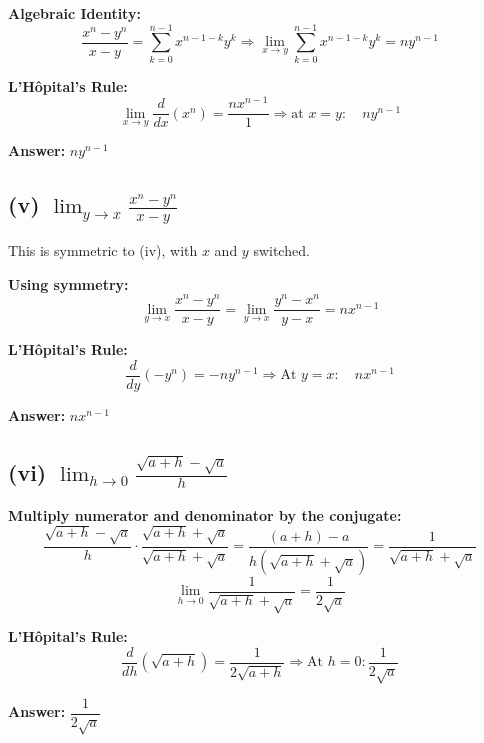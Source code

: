 \documentclass[12pt]{article}
\begin{document}
\textbf{Algebraic Identity:}
\[
\frac{x^n - y^n}{x - y} = \sum_{k=0}^{n-1} x^{n-1-k} y^k
\Rightarrow \lim_{x \to y} \sum_{k=0}^{n-1} x^{n-1-k} y^k = n y^{n-1}
\]

\textbf{L’Hôpital’s Rule:}
\[
\lim_{x \to y} \frac{d}{dx} \left( x^n \right) = \frac{n x^{n-1}}{1} \Rightarrow \text{at } x = y: \quad n y^{n-1}
\]

\textbf{Answer:} \(\boxed{n y^{n-1}}\)

\subsection*{(v) \(\displaystyle \lim_{y \to x} \frac{x^n - y^n}{x - y}\)}

This is symmetric to (iv), with \(x\) and \(y\) switched.

\textbf{Using symmetry:}
\[
\lim_{y \to x} \frac{x^n - y^n}{x - y} = \lim_{y \to x} \frac{y^n - x^n}{y - x} = n x^{n-1}
\]

\textbf{L’Hôpital’s Rule:}
\[
\frac{d}{dy}(-y^n) = -n y^{n-1} \Rightarrow \text{At } y = x: \quad n x^{n-1}
\]

\textbf{Answer:} \(\boxed{n x^{n-1}}\)

\subsection*{(vi) \(\displaystyle \lim_{h \to 0} \frac{\sqrt{a + h} - \sqrt{a}}{h}\)}

\textbf{Multiply numerator and denominator by the conjugate:}
\[
\frac{\sqrt{a + h} - \sqrt{a}}{h} \cdot \frac{\sqrt{a + h} + \sqrt{a}}{\sqrt{a + h} + \sqrt{a}} =
\frac{(a + h) - a}{h(\sqrt{a + h} + \sqrt{a})} = \frac{1}{\sqrt{a + h} + \sqrt{a}}
\]
\[
\lim_{h \to 0} \frac{1}{\sqrt{a + h} + \sqrt{a}} = \frac{1}{2 \sqrt{a}}
\]

\textbf{L’Hôpital’s Rule:}
\[
\frac{d}{dh} \left( \sqrt{a + h} \right) = \frac{1}{2 \sqrt{a + h}} \Rightarrow \text{At } h = 0: \frac{1}{2 \sqrt{a}}
\]

\textbf{Answer:} \(\boxed{\dfrac{1}{2 \sqrt{a}}}\)
\end{document}
